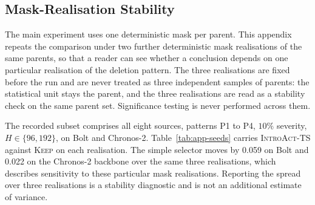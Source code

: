 \documentclass{article}
\newcommand{\introact}{\textsc{IntroAct-TS}}
\begin{document}
\subsection{Mask-Realisation Stability}
\label{app:seeds}
The main experiment uses one deterministic mask per parent. This appendix repeats the
comparison under two further deterministic mask realisations of the same parents, so that a
reader can see whether a conclusion depends on one particular realisation of the deletion
pattern. The three realisations are fixed before the run and are never treated as three
independent samples of parents: the statistical unit stays the parent, and the three
realisations are read as a stability check on the same parent set. Significance testing is
never performed across them.

The recorded subset comprises all eight sources, patterns P1 to P4, $10\%$ severity,
$H \in \{96,192\}$, on Bolt and Chronos-2. Table~\ref{tab:app-seeds} carries \introact{} against
\textsc{Keep} on each realisation. The simple selector moves by 0.059 on
Bolt and 0.022 on the Chronos-2 backbone over the same three realisations,
which describes sensitivity to these particular mask realisations. Reporting the spread over three
realisations is a stability diagnostic and is not an additional estimate of variance.

\begin{table}[htbp]
  \caption{Mask-realisation stability. Each row is one deterministic mask realisation on the
  recorded dual-horizon subset. $\Delta$ is \introact{} minus \textsc{Keep}, so a negative
  value favours \introact{}. The spread across realisations is a stability diagnostic and is not
  an additional sample of parents.}
  \label{tab:app-seeds}
  \centering
  \small
  \setlength{\tabcolsep}{4pt}
\end{table}
\end{document}
